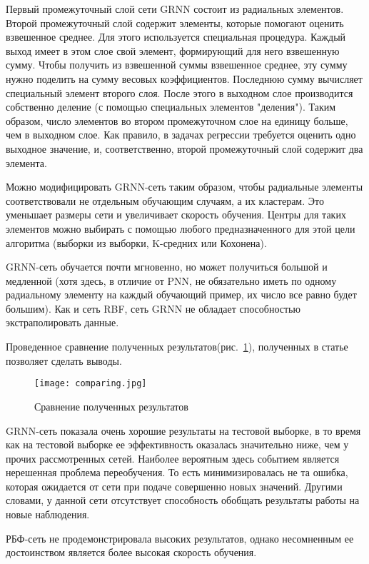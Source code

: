 Первый промежуточный слой сети GRNN состоит из радиальных элементов. Второй промежуточный слой содержит элементы,
которые помогают оценить взвешенное среднее. Для этого используется специальная процедура. Каждый выход имеет в этом
слое свой элемент, формирующий для него взвешенную сумму. Чтобы получить из взвешенной суммы взвешенное среднее, эту
сумму нужно поделить на сумму весовых коэффициентов. Последнюю сумму вычисляет специальный элемент второго слоя.
После этого в выходном слое производится собственно деление (с помощью специальных элементов "деления"). Таким
образом, число элементов во втором промежуточном слое на единицу больше, чем в выходном слое. Как правило, в задачах
регрессии требуется оценить одно выходное значение, и, соответственно, второй промежуточный слой содержит два элемента.

Можно модифицировать GRNN-сеть таким образом, чтобы радиальные элементы соответствовали не отдельным обучающим
случаям, а их кластерам. Это уменьшает размеры сети и увеличивает скорость обучения. Центры для таких элементов
можно выбирать с помощью любого предназначенного для этой цели алгоритма (выборки из выборки, K-средних или Кохонена).

GRNN-сеть обучается почти мгновенно, но может получиться большой и медленной (хотя здесь, в отличие от PNN, не
обязательно иметь по одному радиальному элементу на каждый обучающий пример, их число все равно будет большим).
Как и сеть RBF, сеть GRNN не обладает способностью экстраполировать данные.

Проведенное сравнение полученных результатов(рис.~\ref{fig:analogues:comparing}),
полученных в статье~\cite{using_neural_engines} позволяет сделать выводы.

\begin{figure}[!ht]
  \centering
  \texttt{[image: comparing.jpg]} 
  \caption{Сравнение полученных результатов}
  \label{fig:analogues:comparing}
\end{figure}

GRNN-сеть показала очень хорошие результаты на тестовой выборке, в то время как на тестовой выборке ее эффективность
оказалась значительно ниже, чем у прочих рассмотренных сетей. Наиболее вероятным здесь событием является нерешенная
проблема переобучения. То есть минимизировалась не та ошибка, которая ожидается от сети при подаче совершенно новых
значений. Другими словами, у данной сети отсутствует способность обобщать результаты работы на новые наблюдения.

РБФ-сеть не продемонстрировала высоких результатов, однако несомненным ее достоинством является более высокая скорость
обучения.

